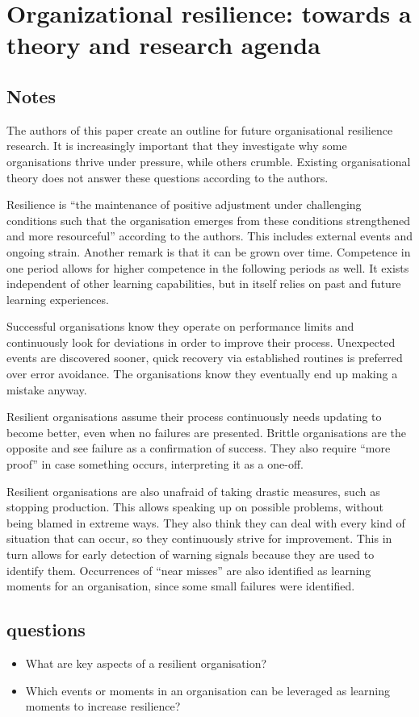 \chapter{Organizational resilience: towards a theory and research agenda \cite{vogus2007organizational}}
\section{Notes}
The authors of this paper create an outline for future organisational resilience research. 
It is increasingly important that they investigate why some organisations thrive under pressure, while others crumble.
Existing organisational theory does not answer these questions according to the authors.

Resilience is ``the maintenance of positive adjustment under challenging conditions such that the organisation emerges from these conditions strengthened and more resourceful'' according to the authors.
This includes external events and ongoing strain. 
Another remark is that it can be grown over time.
Competence in one period allows for higher competence in the following periods as well.
It exists independent of other learning capabilities, but in itself relies on past and future learning experiences.

Successful organisations know they operate on performance limits and continuously look for deviations in order to improve their process.
Unexpected events are discovered sooner, quick recovery via established routines is preferred over error avoidance. 
The organisations know they eventually end up making a mistake anyway.

Resilient organisations assume their process continuously needs updating to become better, even when no failures are presented.
Brittle organisations are the opposite and see failure as a confirmation of success.
They also require ``more proof'' in case something occurs, interpreting it as a one-off.

Resilient organisations are also unafraid of taking drastic measures, such as stopping production. 
This allows speaking up on possible problems, without being blamed in extreme ways.
They also think they can deal with every kind of situation that can occur, so they continuously strive for improvement.
This in turn allows for early detection of warning signals because they are used to identify them.
Occurrences of ``near misses'' are also identified as learning moments for an organisation, since some small failures were identified.

\section{questions}
\begin{itemize}
  \item What are key aspects of a resilient organisation?
  \item Which events or moments in an organisation can be leveraged as learning moments to increase resilience?
\end{itemize}

